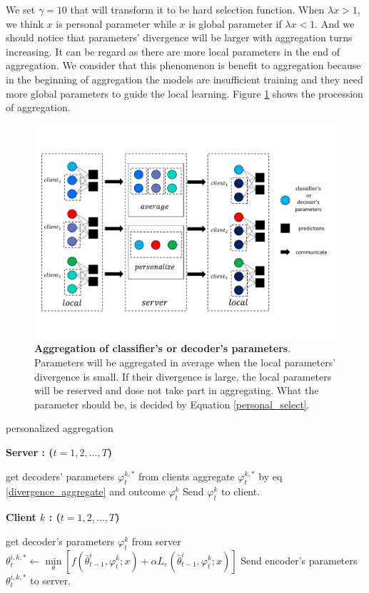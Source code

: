 \documentclass[journal]{IEEEtran}
\begin{document}
We set $\gamma=10$ that will transform it to be hard selection function. When $\lambda x>1$, we think  $x$ is personal parameter while $x$ is global parameter if $\lambda x<1$. And we should notice that parameters' divergence will be larger with aggregation turns increasing. It can be regard as there are more local parameters in the end of aggregation. We consider that this phenomenon is benefit to aggregation because in the beginning of aggregation the models are insufficient training and they need more global parameters to guide the local learning. Figure \ref{fig_personalize_aggregation} shows the procession of aggregation.

\begin{figure}
	\centering
	\includegraphics[scale=0.25]{./picture/personalize_aggregation.pdf}
	\caption{\textbf{Aggregation of classifier's or decoder's parameters}. Parameters will be aggregated in average when the local parameters' divergence is small. If their divergence is large, the local parameters will be reserved and dose not take part in aggregating. What the parameter should be, is decided by Equation \ref{personal_select}.}
	\label{fig_personalize_aggregation}
\end{figure}

\begin{algorithm}
	\caption{personalized aggregation}\label{personalize_algorithm}
	\textbf{Server : ($t=1,2,...,T $)} 
	\begin{algorithmic}[1]
		\State get decoders' parameters $\varphi^{k,*}_{t}$ from clients
		\State  aggregate $\varphi^{k,*}_{t}$ by eq \ref{divergence_aggregate} and outcome $\varphi^{k}_{t}$
		\State Send  $\varphi^{k}_{t}$ to client.
		\EndWhile
	\end{algorithmic}
	\textbf{Client $k$ : ($t=1,2,...,T $)} 
	\begin{algorithmic}[1]
	\State get decoder's parameters $\varphi^{k}_{t}$ from server
	\State $\theta^{i,k,*}_{t} \gets \min\limits_{\theta} [f(\bar{\theta}^{i}_{t-1},\varphi^{k}_{t};x)+\alpha L_{e}(\bar{\theta}^{i}_{t-1},\varphi^{k}_{t};x)] $
	\State Send encoder's parameters $\theta^{i,k,*}_{t}$ to server.
	\EndWhile
\end{algorithmic}

\end{algorithm}
\end{document}
